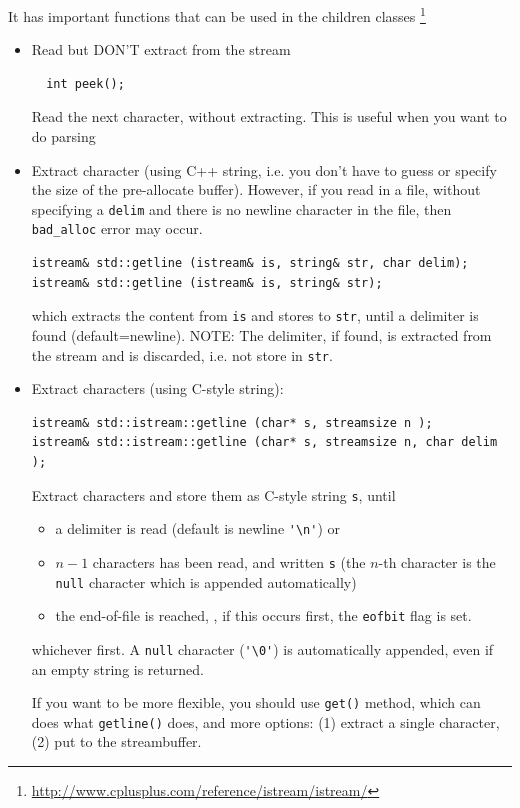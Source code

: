 It has important functions that can be used in the children classes
\footnote{\url{http://www.cplusplus.com/reference/istream/istream/}}
\begin{itemize}
  \item Read but DON'T extract from the stream
  \begin{verbatim}
  int peek();
  \end{verbatim}
  Read the next character, without extracting. This is useful when you want to
  do parsing
  
  \item Extract character (using C++ string, i.e. you don't have to guess or
  specify the size of the pre-allocate buffer). However, if you read in a file,
  without specifying a \verb!delim! and there is no newline character in the
  file, then \verb!bad_alloc! error may occur.
  \begin{verbatim}
istream& std::getline (istream& is, string& str, char delim);
istream& std::getline (istream& is, string& str);
  \end{verbatim}
which extracts the content from \verb!is! and stores to \verb!str!, until a
delimiter is found (default=newline). NOTE: The delimiter, if found, is
extracted from the stream and is discarded, i.e. not store in \verb!str!.
  
  \item Extract characters (using C-style string):
  \begin{verbatim}
istream& std::istream::getline (char* s, streamsize n );
istream& std::istream::getline (char* s, streamsize n, char delim );
  \end{verbatim}
Extract characters and store them as C-style string \verb!s!, until 
\begin{itemize}
  \item a delimiter is read (default is newline \verb!'\n'!) or 
  \item $n-1$ characters has been read, and written \verb!s! (the $n$-th
  character is the \verb!null! character which is appended automatically)
  \item the end-of-file is reached, , if this occurs first, the \verb!eofbit!
  flag is set.
\end{itemize}
whichever first. A \verb!null! character (\verb!'\0'!) is automatically
appended, even if an empty string is returned.

If you want to be more flexible, you should use \verb!get()! method, which can
does what \verb!getline()! does, and more options: (1) extract a single
character, (2) put to the streambuffer.


\end{itemize}
